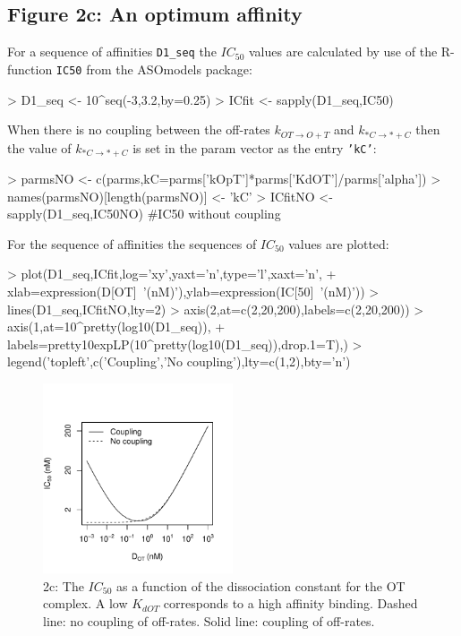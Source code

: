 \documentclass{article}
\newenvironment{Ncenter}{%
  \setlength\topsep{-10pt}
  \setlength\parskip{-100pt}
  \begin{center}
}{%
  \end{center}
}
\newcommand{\kmo}{k_{OT \to O+T}}
\newcommand{\kD}{k_{*C \to *+C}}
\begin{document}
\subsection*{Figure 2c: An optimum affinity}
For a sequence of affinities \texttt{D1\_seq} the $IC_{50}$ values are calculated by use of the R-function \texttt{IC50} from the ASOmodels package:
\begin{Schunk}
\begin{Sinput}
> D1_seq <- 10^seq(-3,3.2,by=0.25)
> ICfit <- sapply(D1_seq,IC50)
\end{Sinput}
\end{Schunk}
When there is no coupling between the off-rates $\kmo$ and $\kD$ then the value of $\kD$ is set in the param vector as the entry \texttt{'kC'}:
\begin{Schunk}
\begin{Sinput}
> parmsNO <- c(parms,kC=parms['kOpT']*parms['KdOT']/parms['alpha'])
> names(parmsNO)[length(parmsNO)] <- 'kC'
> ICfitNO <- sapply(D1_seq,IC50NO) #IC50 without coupling
\end{Sinput}
\end{Schunk}
For the sequence of affinities the sequences of $IC_{50}$ values are plotted:
\begin{Schunk}
\begin{Sinput}
> plot(D1_seq,ICfit,log='xy',yaxt='n',type='l',xaxt='n',
+      xlab=expression(D[OT]~'(nM)'),ylab=expression(IC[50]~'(nM)'))
> lines(D1_seq,ICfitNO,lty=2)
> axis(2,at=c(2,20,200),labels=c(2,20,200))
> axis(1,at=10^pretty(log10(D1_seq)),
+      labels=pretty10expLP(10^pretty(log10(D1_seq)),drop.1=T),)
> legend('topleft',c('Coupling','No coupling'),lty=c(1,2),bty='n')
\end{Sinput}
\end{Schunk}
\begin{figure}[!h]
\begin{Ncenter}
\includegraphics[width=0.5\textwidth]{Vignette2-Fig3}
\end{Ncenter}
\caption{2c: The $IC_{50}$ as a function of the dissociation constant for the OT complex. A low $K_{dOT}$ corresponds to a high affinity binding. Dashed line: no coupling of off-rates. Solid line: coupling of off-rates.}
\end{figure}
\end{document}
